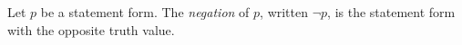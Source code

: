 \guard





\begin{defn}
\label{defn:negationOfStatement}
  Let $p$ be a statement form.
  The \emph{negation} of $p$, written $\neg p$, is the statement form with the opposite truth value.
\end{defn}
